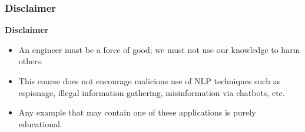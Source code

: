 \documentclass{beamer}
\begin{document}
\begin{frame}
	\frametitle{Disclaimer}
	
	\begin{tcolorbox}[colback=red,
		colframe=red,  
		arc=0pt,outer arc=0pt,
		valign=top, 
		halign=center,
		width=\textwidth]
		
		\color{white}
		{\bfseries Disclaimer}
		
	\end{tcolorbox}\vspace{-.5cm}
	\begin{tcolorbox}[colback=my-grey,
		colframe=my-grey,  
		center, arc=0pt,outer arc=0pt,
		valign=top, 
		halign=left,
		width=\textwidth]
		
		\begin{itemize}
			\item An engineer must be a force of good; we must not use our knowledge to harm others.
			\item This course does not encourage malicious use of NLP techniques such as espionage, illegal information gathering, misinformation via chatbots, etc.
			\item Any example that may contain one of these applications is purely educational.	
		\end{itemize}
		
	\end{tcolorbox}
	
\end{frame}
\end{document}

